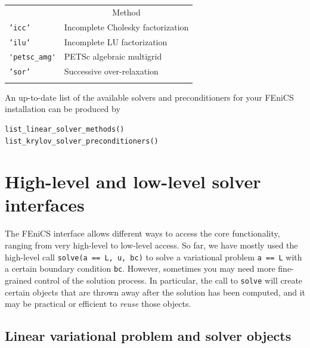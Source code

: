 \documentclass[graybox,envcountchap,sectrefs,final]{svmonodo}
\begin{document}
{\small   %

\vspace{4mm}

\begin{tabular}{ll}
\hline\noalign{\smallskip}
\multicolumn{1}{c}{ Name } & \multicolumn{1}{c}{ Method } \\
\noalign{\smallskip}\svhline\noalign{\smallskip}
\texttt{'icc'}       & Incomplete Cholesky factorization \\
\texttt{'ilu'}       & Incomplete LU factorization       \\
\Verb!'petsc_amg'! & PETSc algebraic multigrid         \\
\texttt{'sor'}       & Successive over-relaxation        \\
\noalign{\smallskip}\hline\noalign{\smallskip}
\end{tabular}

\vspace{4mm}

}


\noindent
An up-to-date list of the available solvers and preconditioners
for your FEniCS installation can be produced by

\begin{lstlisting}[language=Python,style=graycolor]
list_linear_solver_methods()
list_krylov_solver_preconditioners()
\end{lstlisting}

\section{High-level and low-level solver interfaces}

The FEniCS interface allows different ways to access the core
functionality, ranging from very high-level to low-level access. So
far, we have mostly used the high-level call \texttt{solve(a == L, u, bc)} to
solve a variational problem \texttt{a == L} with a certain boundary condition
\texttt{bc}. However, sometimes you may need more fine-grained control of
the solution process. In particular, the call to \texttt{solve} will create
certain objects that are thrown away after the solution has been
computed, and it may be practical or efficient to \emph{reuse} those
objects.

\subsection{Linear variational problem and solver objects}
\label{ch:poisson0:solver:problem}
\end{document}
